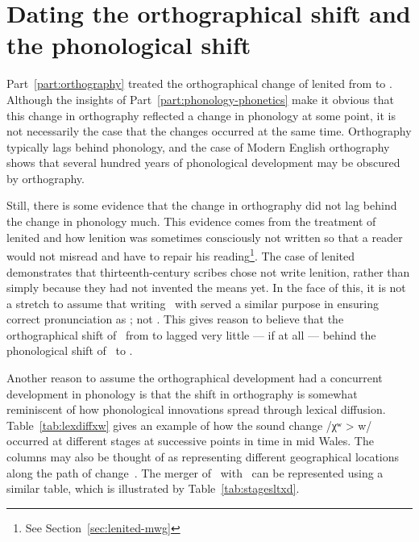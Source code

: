 \section{Dating the orthographical shift and the phonological shift}
\label{sec:change-lenition-as}

Part~\ref{part:orthography} treated the orthographical change of lenited  from  to . Although the insights of Part~\ref{part:phonology-phonetics} make it obvious that this change in orthography reflected a change in phonology at some point, it is not necessarily the case that the changes occurred at the same time. Orthography typically lags behind phonology, and the case of Modern English orthography shows that several hundred years of phonological development may be obscured by orthography.

Still, there is some evidence that the change in orthography did not lag behind the change in phonology much. This evidence comes from the  treatment of lenited  and how lenition was sometimes consciously not written so that a reader would not misread and have to repair his reading\footnote{See Section~\ref{sec:lenited-mwg}}. The case of lenited  demonstrates that thirteenth-century scribes chose not write lenition, rather than simply because they had not invented the means yet. In the face of this, it is not a stretch to assume that writing \lT\ with  served a similar purpose in ensuring correct pronunciation as \lT; not \xD. This gives reason to believe that the orthographical shift of \lT\ from  to  lagged very little --- if at all --- behind the phonological shift of \lT\ to \xD.

Another reason to assume the orthographical development had a concurrent development in phonology is that the shift in orthography is somewhat reminiscent of how phonological innovations spread through lexical diffusion. Table~\ref{tab:lexdiffxw} gives an example of how the sound change /χʷ > w/  occurred at different stages at successive points in time in mid Wales. The columns may also be thought of as representing different geographical locations along the path of change~\autocite{Wil_Lexical05}. The merger of \lT\ with \xD\ can be represented using a similar table, which is illustrated by Table~\ref{tab:stagesltxd}.


